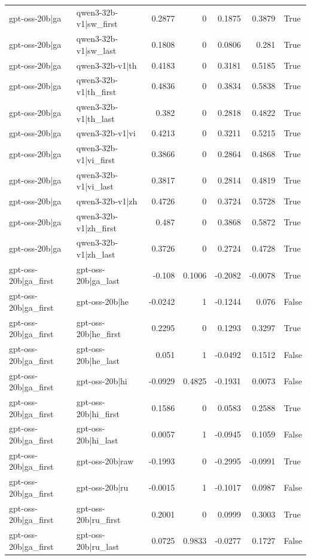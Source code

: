 \begin{table}
\begin{tabular}{l l r r r r l}
gpt-oss-20b|ga & qwen3-32b-v1|sw_first & 0.2877 & 0 & 0.1875 & 0.3879 & True \\
gpt-oss-20b|ga & qwen3-32b-v1|sw_last & 0.1808 & 0 & 0.0806 & 0.281 & True \\
gpt-oss-20b|ga & qwen3-32b-v1|th & 0.4183 & 0 & 0.3181 & 0.5185 & True \\
gpt-oss-20b|ga & qwen3-32b-v1|th_first & 0.4836 & 0 & 0.3834 & 0.5838 & True \\
gpt-oss-20b|ga & qwen3-32b-v1|th_last & 0.382 & 0 & 0.2818 & 0.4822 & True \\
gpt-oss-20b|ga & qwen3-32b-v1|vi & 0.4213 & 0 & 0.3211 & 0.5215 & True \\
gpt-oss-20b|ga & qwen3-32b-v1|vi_first & 0.3866 & 0 & 0.2864 & 0.4868 & True \\
gpt-oss-20b|ga & qwen3-32b-v1|vi_last & 0.3817 & 0 & 0.2814 & 0.4819 & True \\
gpt-oss-20b|ga & qwen3-32b-v1|zh & 0.4726 & 0 & 0.3724 & 0.5728 & True \\
gpt-oss-20b|ga & qwen3-32b-v1|zh_first & 0.487 & 0 & 0.3868 & 0.5872 & True \\
gpt-oss-20b|ga & qwen3-32b-v1|zh_last & 0.3726 & 0 & 0.2724 & 0.4728 & True \\
gpt-oss-20b|ga_first & gpt-oss-20b|ga_last & -0.108 & 0.1006 & -0.2082 & -0.0078 & True \\
gpt-oss-20b|ga_first & gpt-oss-20b|he & -0.0242 & 1 & -0.1244 & 0.076 & False \\
gpt-oss-20b|ga_first & gpt-oss-20b|he_first & 0.2295 & 0 & 0.1293 & 0.3297 & True \\
gpt-oss-20b|ga_first & gpt-oss-20b|he_last & 0.051 & 1 & -0.0492 & 0.1512 & False \\
gpt-oss-20b|ga_first & gpt-oss-20b|hi & -0.0929 & 0.4825 & -0.1931 & 0.0073 & False \\
gpt-oss-20b|ga_first & gpt-oss-20b|hi_first & 0.1586 & 0 & 0.0583 & 0.2588 & True \\
gpt-oss-20b|ga_first & gpt-oss-20b|hi_last & 0.0057 & 1 & -0.0945 & 0.1059 & False \\
gpt-oss-20b|ga_first & gpt-oss-20b|raw & -0.1993 & 0 & -0.2995 & -0.0991 & True \\
gpt-oss-20b|ga_first & gpt-oss-20b|ru & -0.0015 & 1 & -0.1017 & 0.0987 & False \\
gpt-oss-20b|ga_first & gpt-oss-20b|ru_first & 0.2001 & 0 & 0.0999 & 0.3003 & True \\
gpt-oss-20b|ga_first & gpt-oss-20b|ru_last & 0.0725 & 0.9833 & -0.0277 & 0.1727 & False \\

\end{tabular}
\end{table}
